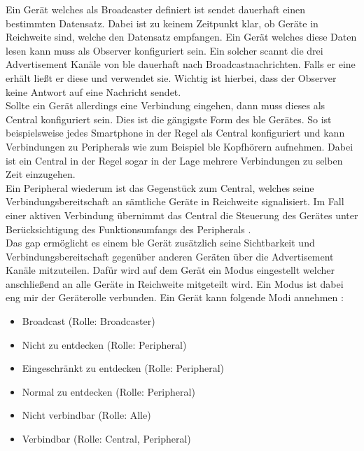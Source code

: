 \noindent Ein Gerät welches als Broadcaster definiert ist sendet dauerhaft einen bestimmten Datensatz. Dabei ist zu keinem Zeitpunkt klar, ob Geräte in Reichweite sind, welche den Datensatz empfangen. Ein Gerät welches diese Daten lesen kann muss als Observer konfiguriert sein. Ein solcher scannt die drei Advertisement Kanäle von \ac{ble} dauerhaft nach Broadcastnachrichten. Falls er eine erhält ließt er diese und verwendet sie. Wichtig ist hierbei, dass der Observer keine Antwort auf eine Nachricht sendet.\\  

\noindent Sollte ein Gerät allerdings eine Verbindung eingehen, dann muss dieses als Central konfiguriert sein. Dies ist die gängigste Form des \ac{ble} Gerätes. So ist beispielsweise jedes Smartphone in der Regel als Central konfiguriert und kann Verbindungen zu Peripherals wie zum Beispiel \ac{ble} Kopfhörern aufnehmen. Dabei ist ein Central in der Regel sogar in der Lage mehrere Verbindungen zu selben Zeit einzugehen.\\

\noindent Ein Peripheral wiederum ist das Gegenstück zum Central, welches seine Verbindungsbereitschaft an sämtliche Geräte in Reichweite signalisiert. Im Fall einer aktiven Verbindung übernimmt das Central die Steuerung des Gerätes unter Berücksichtigung des Funktionsumfangs des Peripherals \cite[Seite 34]{Usama17:BBS}.\\

\noindent Das \ac{gap} ermöglicht es einem \ac{ble} Gerät zusätzlich seine Sichtbarkeit und Verbindungsbereitschaft gegenüber anderen Geräten über die Advertisement Kanäle mitzuteilen. Dafür wird auf dem Gerät ein Modus eingestellt welcher anschließend an alle Geräte in Reichweite mitgeteilt wird. Ein Modus ist dabei eng mir der Geräterolle verbunden. Ein Gerät kann folgende Modi annehmen \cite[Seite 35]{Townsend14:GSB}:
\begin{itemize}
	\item{Broadcast (Rolle: Broadcaster)}
	\item{Nicht zu entdecken (Rolle: Peripheral)}
	\item{Eingeschränkt zu entdecken (Rolle: Peripheral)}
	\item{Normal zu entdecken (Rolle: Peripheral)}
	\item{Nicht verbindbar (Rolle: Alle)}
	\item{Verbindbar (Rolle: Central, Peripheral)}
\end{itemize}   

